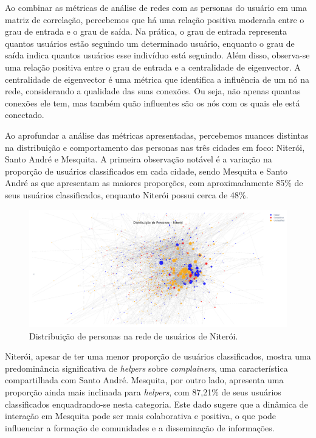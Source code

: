 Ao combinar as métricas de análise de redes com as personas do usuário em uma matriz de correlação, percebemos que há uma relação positiva moderada entre o grau de entrada e o grau de saída. Na prática, o grau de entrada representa quantos usuários estão seguindo um determinado usuário, enquanto o grau de saída indica quantos usuários esse indivíduo está seguindo. Além disso, observa-se uma relação positiva entre o grau de entrada e a centralidade de eigenvector. A centralidade de eigenvector é uma métrica que identifica a influência de um nó na rede, considerando a qualidade das suas conexões. Ou seja, não apenas quantas conexões ele tem, mas também quão influentes são os nós com os quais ele está conectado.

Ao aprofundar a análise das métricas apresentadas, percebemos nuances distintas na distribuição e comportamento das personas nas três cidades em foco: Niterói, Santo André e Mesquita. A primeira observação notável é a variação na proporção de usuários classificados em cada cidade, sendo Mesquita e Santo André as que apresentam as maiores proporções, com aproximadamente 85\% de seus usuários classificados, enquanto Niterói possui cerca de 48\%.

\begin{figure}[h]
    \centering
    \includegraphics[width=1\textwidth]{images/network_personas_niteroi.png}
    \caption{Distribuição de personas na rede de usuários de Niterói.}
    \label{fig:network_personas_niteroi}
\end{figure}

Niterói, apesar de ter uma menor proporção de usuários classificados, mostra uma predominância significativa de \textit{helpers} sobre \textit{complainers}, uma característica compartilhada com Santo André. Mesquita, por outro lado, apresenta uma proporção ainda mais inclinada para \textit{helpers}, com 87,21\% de seus usuários classificados enquadrando-se nesta categoria. Este dado sugere que a dinâmica de interação em Mesquita pode ser mais colaborativa e positiva, o que pode influenciar a formação de comunidades e a disseminação de informações.

